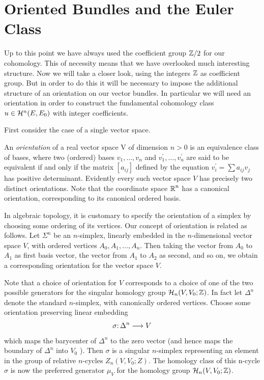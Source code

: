 \chapter{Oriented Bundles and the Euler Class}\label{ch-9}%

Up to this point we have always used the coefficient group $\mathbb{Z} / 2$ for our cohomology. This of necessity means that we have overlooked much interesting structure. Now we will take a closer look, using the integers $\mathbb{Z}$ as coefficient group. But in order to do this it will be necessary to impose the additional structure of an orientation on our vector bundles. In particular we will need an orientation in order to construct the fundamental cohomology class $u \in  \mathcal{H}^{ n }(E, E_{0})$ with integer coefficients.

First consider the case of a single vector space.
\begin{definition}\label{def:9-1}
	An \textit{orientation} of a real vector space V of dimension $ n >0$ is an equivalence class of bases, where two (ordered) bases $v_{1}, \dots, v_{ n }$ and $v_{1}^{\prime}, \dots, v_{ n }^{\prime}$ are said to be equivalent if and only if the matrix $\left[a_{i j}\right]$ defined by the equation $v_{i}^{\prime}=\sum a_{i j} v_{j}$ has positive determinant. Evidently every such vector space $V$ has precisely two distinct orientations. Note that the coordinate space $\boldsymbol{\mathbb{R}}^{ n }$ has a canonical orientation, corresponding to its canonical ordered basis.
\end{definition}

In algebraic topology, it is customary to specify the orientation of a simplex by choosing some ordering of its vertices. Our concept of orientation is related as follows. Let $\Sigma^{ n }$ be an $ n $-simplex, linearly embedded in the $n$-dimensional vector space $V$, with ordered vertices $A_{0}, A_{1}, \dots, A_{n}$. Then taking the vector from $A_{0}$ to $A_{1}$ as first basis vector, the vector from $A_{1}$ to $A_{2}$ as second, and so on, we obtain a corresponding orientation for the vector space $V$. 

Note that a choice of orientation for $V$ corresponds to a choice of one of the two possible generators for the singular homology group $\mathcal{H}_{ n }(V, V_{0} ; \mathbb{Z})$. In fact let $\Delta^{ n }$ denote the standard $n$-simplex, with canonically ordered vertices. Choose some orientation preserving linear embedding
\[\map{\sigma}{\Delta^{ n }}{V}
\]
which maps the barycenter of $\Delta^{ n }$ to the zero vector (and hence maps the boundary of $\Delta^{ n }$ into $V_{0}$ ). Then $\sigma$ is a singular $ n $-simplex representing an element in the group of relative $n$-cycles $Z_{ n }(V, V_{0} ; Z)$. The homology class of this n-cycle $\sigma$ is now the preferred generator $\mu_{V}$ for the homology group $\mathcal{H}_{ n }(V, V_{0} ; \mathbb{Z})$.

